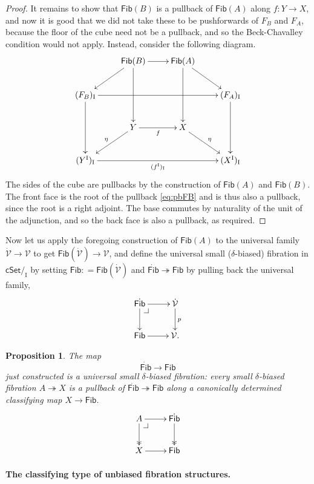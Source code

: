 \documentclass[12pt]{article}
\makeatletter
\newcommand{\cSet}{\ensuremath{\mathsf{cSet}}}
\newcommand{\ra}{\ensuremath{\rightarrow}}
\newcommand{\fib}{\ensuremath{\twoheadrightarrow}}
\renewcommand{\to}{\ensuremath{\rightarrow}}
\newcommand{\I}{\ensuremath{\mathrm{I}}}
\newcommand{\V}{\ensuremath{\mathcal{V}}}
\newcommand{\VV}{\ensuremath{\dot{\mathcal{V}}}}
\newcommand{\Fib}{\ensuremath{\mathsf{Fib}}}
\newcommand{\FFib}{\ensuremath{\dot{\mathsf{Fib}}}}
\newtheorem{proposition}[theorem]{Proposition}
\theoremstyle{remark}
\theoremstyle{definition}
\newcommand{\pbcorner}[1][dr]{\save*!/#1-1.2pc/#1:(-1,1)@^{|-}\restore}
\makeatother
\begin{document}
\begin{proof}
It remains to show that $\Fib(B)$ is a pullback of $\Fib(A)$ along $f:Y\ra X$, and now it is good that we did not take these to be pushforwards of $F_B$ and $F_A$, because the floor of the cube need not be a pullback, and so the Beck-Chavalley condition would not apply.  Instead, consider the following diagram.
\begin{equation}\label{diagram:fibU10}
\xymatrix{
& \Fib(B) \ar[ld] \ar[dd]  \ar[r] & \Fib(A) \ar[dd] \ar[rd] & \\
(F_B)_\I \ar[dd] \ar[rrr] &&& (F_A)_\I \ar[dd] \\
& Y \ar[ld]_\eta \ar[r]_f & X \ar[rd]^\eta &\\
(Y^\I)_\I \ar[rrr]_{(f^\I)_\I} &&& (X^\I)_\I 
 }
\end{equation}
The sides of the cube are pullbacks by the construction of $\Fib(A)$ and $\Fib(B)$. The front face is the root of the pullback \eqref{eq:pbFB} and is thus also a pullback, since the root is a right adjoint. The base commutes by naturality of the unit of the adjunction, and so the back face is also a pullback, as required.  
\end{proof}



Now let us apply the foregoing construction of $\Fib(A)$  to the universal family $\VV\to\V$ to get $\Fib(\VV) \ra \V$, and define the universal small ($\delta$-biased) fibration in $\cSet/_\I$ by setting $\Fib : =\Fib(\VV)$ and $\FFib\fib\Fib$ by pulling back the universal family,
\begin{equation}\label{diagram:universalfib}
\xymatrix{
\FFib \ar[d] \ar[r]  \pbcorner & \VV\ar[d]^p\\
\Fib \ar[r] & \V.
}
\end{equation}

\begin{proposition}\label{prop:UniversalFib}
The map $$\FFib\ra\Fib$$ just constructed is a \emph{universal small $\delta$-biased fibration}: every small $\delta$-biased fibration $A \fib X$ is a pullback of $\FFib \fib \Fib$ along a canonically determined classifying map $X\ra \Fib$.
\begin{equation}\label{diagram:classifyfib}
\xymatrix{
A \ar@{>>}[d] \ar[r]  \pbcorner & \FFib \ar@{>>}[d] \\
X \ar[r] & \Fib
}
\end{equation}
\end{proposition}

\paragraph{The classifying type of unbiased fibration structures.}\label{par:classifyunbiasedfib} 
\end{document}
